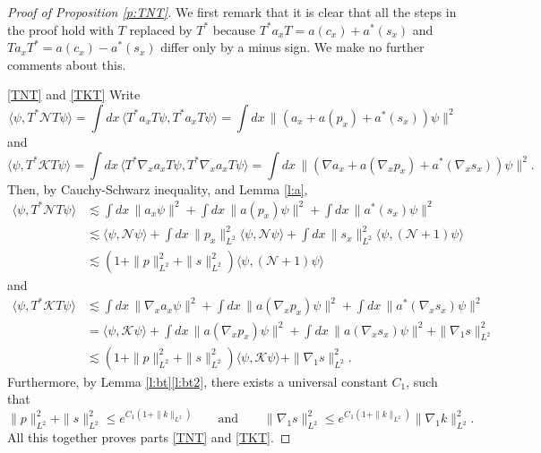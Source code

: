 \documentclass[11pt,a4paper]{scrartcl}
\newcommand{\N}{\mathcal{N}}
\newcommand{\K}{\mathcal{K}}
\begin{document}
\begin{proof}[Proof of Proposition \ref{p:TNT}]
  We first remark that it is clear that all the steps in the proof hold with
  $T$ replaced by $T^*$ because $T^* a_x T = a(c_x) + a^*(s_x)$ and $T a_x T^*
  = a(c_x) - a^*(s_x)$ differ only by a minus sign. We make no further
  comments about this.


  \eqref{TNT} and \eqref{TKT} Write
  \[
    \langle \psi, T^* \N T \psi \rangle = \int dx \, \langle T^* a_x T \psi,
    T^* a_x T \psi \rangle = \int dx \, \| (a_x + a(p_x) + a^*(s_x)) \psi
    \|^2
  \]
  and
  \[
    \langle \psi, T^* \K T \psi \rangle = \int dx \, \langle T^* \nabla_x a_x
    T \psi, T^* \nabla_x a_x T \psi \rangle = \int dx \, \| (\nabla a_x +
    a(\nabla_x p_x) + a^*(\nabla_x s_x)) \psi \|^2.
  \]
  Then, by Cauchy-Schwarz inequality, and Lemma \ref{l:a},
  \begin{align*}
    \langle \psi, T^* \N T \psi \rangle & \apprle \int dx \, \| a_x \psi \|^2
    + \int dx \, \| a(p_x) \psi \|^2 + \int dx \, \| a^*(s_x) \psi \|^2 \\
    & \apprle \langle \psi, \N \psi \rangle + \int dx \, \| p_x \|_{L^2}^2
    \langle \psi, \N \psi \rangle + \int dx \, \| s_x \|_{L^2}^2 \langle
    \psi, (\N+1) \psi \rangle \\
    & \apprle (1 + \| p \|_{L^2}^2 + \| s \|_{L^2}^2) \langle \psi, (\N+1) \psi
    \rangle
  \end{align*}
  and
  \begin{align*}
    \langle \psi, T^* \K T \psi \rangle & \apprle \int dx \, \| \nabla_x a_x
    \psi \|^2 + \int dx \, \| a(\nabla_x p_x) \psi \|^2 + \int dx \, \|
    a^*(\nabla_x s_x) \psi \|^2 \\
    & = \langle \psi, \K \psi \rangle + \int dx \, \| a(\nabla_x p_x) \psi
    \|^2 + \int dx \, \| a(\nabla_x s_x) \psi \|^2 + \| \nabla_1 s \|_{L^2}^2
    \\
    & \apprle (1 + \| p \|_{L^2}^2 + \| s \|_{L^2}^2) \langle \psi, \K \psi
    \rangle + \| \nabla_1 s \|_{L^2}^2.
  \end{align*}
  Furthermore, by Lemma \ref{l:bt}\ref{l:bt2}, there exists a universal
  constant $C_1$, such that
  \begin{equation} \label{c1}
    \| p \|_{L^2}^2 + \| s \|_{L^2}^2 \le e^{C_1 (1+\| k \|_{L^2})} \qquad
    \text{and} \qquad \| \nabla_1 s \|_{L^2}^2 \le e^{C_1 (1+\|k \|_{L^2})} \|
    \nabla_1 k \|_{L^2}^2.
  \end{equation}
  All this together proves parts \eqref{TNT} and \eqref{TKT}.
  


\end{proof}
\end{document}
